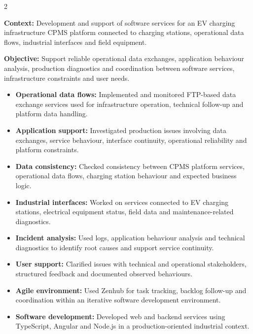 \documentclass[8pt,a4paper,ragged2e,withhyper]{altacv}
\begin{document}



\makecvheader
\vspace{-0.3cm}


\begin{paracol}{2}



\textbf{Context:} Development and support of software services for an EV charging infrastructure CPMS platform connected to charging stations, operational data flows, industrial interfaces and field equipment.

\textbf{Objective:} Support reliable operational data exchanges, application behaviour analysis, production diagnostics and coordination between software services, infrastructure constraints and user needs.

\begin{itemize}
  \item \textbf{Operational data flows:} Implemented and monitored FTP-based data exchange services used for infrastructure operation, technical follow-up and platform data handling.
  \item \textbf{Application support:} Investigated production issues involving data exchanges, service behaviour, interface continuity, operational reliability and platform constraints.
  \item \textbf{Data consistency:} Checked consistency between CPMS platform services, operational data flows, charging station behaviour and expected business logic.
  \item \textbf{Industrial interfaces:} Worked on services connected to EV charging stations, electrical equipment status, field data and maintenance-related diagnostics.
  \item \textbf{Incident analysis:} Used logs, application behaviour analysis and technical diagnostics to identify root causes and support service continuity.
  \item \textbf{User support:} Clarified issues with technical and operational stakeholders, structured feedback and documented observed behaviours.
  \item \textbf{Agile environment:} Used Zenhub for task tracking, backlog follow-up and coordination within an iterative software development environment.
  \item \textbf{Software development:} Developed web and backend services using TypeScript, Angular and Node.js in a production-oriented industrial context.
\end{itemize}


\end{paracol}
\end{document}
